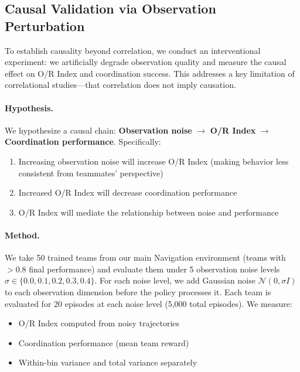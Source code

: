 
\subsection{Causal Validation via Observation Perturbation}
\label{sec:causal_validation}

To establish causality beyond correlation, we conduct an interventional experiment: we artificially degrade observation quality and measure the causal effect on O/R Index and coordination success. This addresses a key limitation of correlational studies—that correlation does not imply causation.

\paragraph{Hypothesis.}
We hypothesize a causal chain: \textbf{Observation noise} $\rightarrow$ \textbf{O/R Index} $\rightarrow$ \textbf{Coordination performance}. Specifically:
\begin{enumerate}
    \item Increasing observation noise will increase O/R Index (making behavior less consistent from teammates' perspective)
    \item Increased O/R Index will decrease coordination performance
    \item O/R Index will mediate the relationship between noise and performance
\end{enumerate}

\paragraph{Method.}
We take 50 trained teams from our main Navigation environment (teams with $>0.8$ final performance) and evaluate them under 5 observation noise levels $\sigma \in \{0.0, 0.1, 0.2, 0.3, 0.4\}$. For each noise level, we add Gaussian noise $\mathcal{N}(0, \sigma I)$ to each observation dimension before the policy processes it. Each team is evaluated for 20 episodes at each noise level (5,000 total episodes). We measure:
\begin{itemize}
    \item O/R Index computed from noisy trajectories
    \item Coordination performance (mean team reward)
    \item Within-bin variance and total variance separately
\end{itemize}


